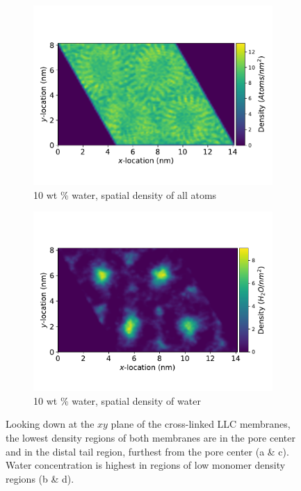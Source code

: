 \documentclass[journal=jpcbfk,manuscript=article]{achemso}
\begin{document}
\begin{figure}[!htb]
\begin{subfigure}{0.45\textwidth}
  \includegraphics[width=\textwidth]{total_density_10wt.pdf}
  \caption{10 wt \% water, spatial density of all atoms}\label{fig:total_density_10wt}
  \end{subfigure}
  \begin{subfigure}{0.45\textwidth}
  \vspace{-0.5cm}
  \includegraphics[width=\textwidth]{total_water_density_10wt.pdf}
  \caption{10 wt \% water, spatial density of water}\label{fig:total_water_density_10wt}
  \end{subfigure}
  \caption{Looking down at the $xy$ plane of the cross-linked LLC membranes, the lowest
  density regions of both membranes are in the pore center and in the distal tail region,
  furthest from the pore center (a \& c). Water concentration is highest in regions of
  low monomer density regions (b \& d).}\label{fig:total_density}
  \end{figure}
  
\end{document}
